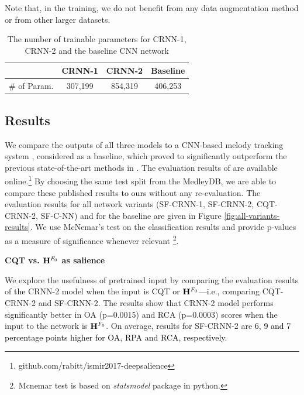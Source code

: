 \documentclass{article}
\newcommand{\db}[1]{{\textcolor{black}{#1}}}
\newcommand{\jb}[1]{{\textcolor{black}{#1}}}
\newcommand{\jbcor}[2]{{\textcolor{black}{#2}}}
\begin{document}
Note that, in the training, we do not benefit from any data augmentation method or from other larger datasets.  

\begin{table}
 \begin{center}
 \begin{tabular}{|r|c|c|c|}
  \hline
                 & CRNN-1  & CRNN-2 & Baseline \\
  \hline
  \# of Param.   & 307,199  & 854,319 & 406,253  \\
  \hline
  \end{tabular}
 \end{center}
 \caption{The number of trainable parameters for CRNN-1, CRNN-2 and the baseline CNN network \cite{bittner2017_deep}}
 \label{tab:network-parameters}
\end{table}

\subsection{Results}
We compare the outputs of all three models to a CNN-based melody tracking system \cite{bittner2017_deep}, considered as a baseline, which proved to significantly outperform the previous state-of-the-art methods in \cite{melodia,bittner2016_comparison}. 
The evaluation results of \cite{bittner2017_deep} are available online.\footnote{github.com/rabitt/ismir2017-deepsalience} By choosing the same test split from the MedleyDB, we are able to compare \jbcor{to those}{these} published results \jb{to ours} without any re-evaluation. The evaluation results for all network variants (SF-CRNN-1, SF-CRNN-2, CQT-CRNN-2, SF-C-NN) and for the baseline are given in Figure \ref{fig:all-variants-results}. We use McNemar's test on the classification results and provide p-values as a measure of significance whenever relevant \db{\footnote{Mcnemar test is based on \emph{statsmodel} package in python.}}.

\vspace{0.15cm}
\hspace{-0.45cm}\textbf{CQT vs. $\mathbf{H}^{F_{0}}$ as salience} 

\hspace{-0.45cm}We explore the usefulness of \jbcor{a}{} pretrained input by comparing the evaluation results of \jb{the} CRNN-2 model when the input is CQT \jbcor{and}{or} $\mathbf{H}^{F_{0}}$\jbcor{(}{---i.e.,} comparing CQT-CRNN-2 and SF-CRNN-2\jbcor{ variants)}{}. 
The results show that CRNN-2 model performs significantly better in OA (p=0.0015) and RCA (p=0.0003) scores when the input to the network is $\mathbf{H}^{F_{0}}$. 
On average, results for SF-CRNN-2 are
\jb{6, 9 and 7 percentage points higher for OA, RPA and RCA, respectively.}
\end{document}
